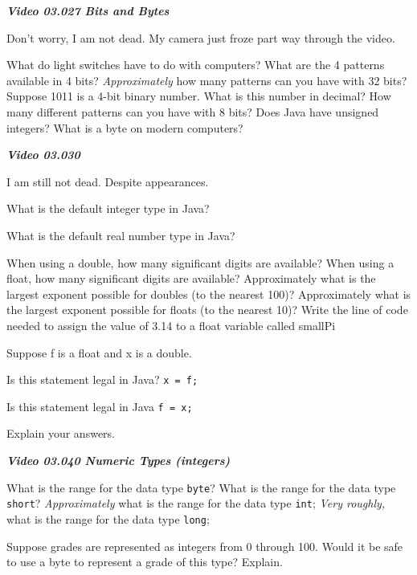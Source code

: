 \documentclass[letterpaper,11pt]{exam}
\newcommand{\videoheading}[1]{\Large\textbf{\textit{#1}}}
\begin{document}
\begin{questions}
\videoheading{Video 03.027 Bits and Bytes}

Don't worry, I am not dead.  My camera just froze part way through the video.

\question What do light switches have to do with computers?
\question What are the 4 patterns available in 4 bits?
\question \textit{Approximately} how many patterns can you have with 32 bits?
\question Suppose 1011 is a 4-bit binary number.  What is this number in decimal?
\question How many different patterns can you have with 8 bits?
\question Does Java have unsigned integers?
\question What is a byte on modern computers?

\videoheading{Video 03.030}

I am still not dead.  Despite appearances.

\question What is the default integer type in Java?

\question What is the default real number type in Java?

\question When using a double, how many significant digits are available?
\question When using a float, how many significant digits are available?
\question Approximately what is the largest exponent possible for doubles (to the nearest 100)?
\question Approximately what is the largest exponent possible for floats (to the nearest 10)?
\question Write the line of code needed to assign the value of 3.14 to a float variable called smallPi



\begin{samepage}
  \question Suppose f is a float and x is a double.  

  \nopagebreak
  Is this statement legal in Java? \texttt{x = f;}

  \nopagebreak
  Is this statement legal in Java \texttt{f = x;}

  \nopagebreak
  Explain your answers.
\end{samepage}

\videoheading{Video 03.040 Numeric Types (integers)}

\question What is the range for the data type \texttt{byte}?
\question What is the range for the data type \texttt{short}?
\question \textit{Approximately} what is the range for the data type \texttt{int};
\question \textit{Very roughly,} what is the range for the data type \texttt{long};

\question Suppose grades are represented as integers from 0 through 100.  Would it be safe to use a byte to represent a grade of this type? Explain.
\vspace{1cm}


\end{questions}
\end{document}
